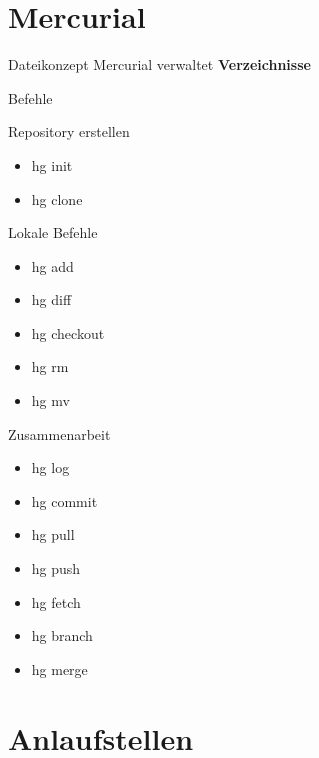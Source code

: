 \documentclass[presentation]{beamer}
\begin{document}
\section{Mercurial}
\begin{frame}{Dateikonzept}
  Mercurial verwaltet \textbf{Verzeichnisse}
\end{frame}
\begin{frame}{Befehle}
\end{frame}
\begin{frame}{Repository erstellen}
  \begin{itemize}[<+-| alert@+>]
  \item hg init
  \item hg clone
  \end{itemize}
\end{frame}
\begin{frame}{Lokale Befehle}
  \begin{itemize}[<+- | alert@+>]
  \item hg add
  \item hg diff
  \item hg checkout
  \item hg rm
  \item hg mv
  \end{itemize}
\end{frame}
\begin{frame}{Zusammenarbeit}
  \begin{itemize}[<+- | alert@+>]
  \item hg log
  \item hg commit
  \item hg pull
  \item hg push
  \item hg fetch
  \item hg branch
  \item hg merge
  \end{itemize}
\end{frame}

\section{Anlaufstellen}
\end{document}
